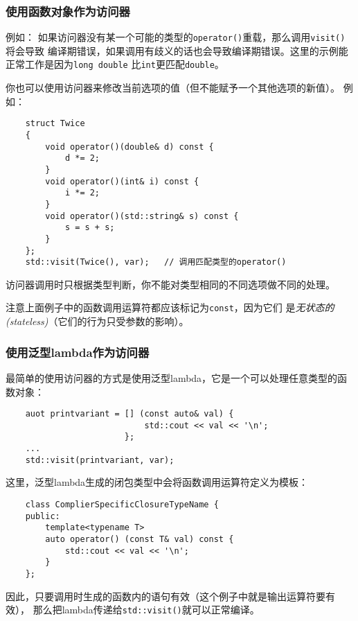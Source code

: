 \subsubsection{使用函数对象作为访问器}
例如：
如果访问器没有某一个可能的类型的\texttt{operator()}重载，那么调用\texttt{visit()}将会导致
编译期错误，如果调用有歧义的话也会导致编译期错误。这里的示例能正常工作是因为\texttt{long double}
比\texttt{int}更匹配\texttt{double}。

你也可以使用访问器来修改当前选项的值（但不能赋予一个其他选项的新值）。
例如：
\begin{lstlisting}
    struct Twice
    {
        void operator()(double& d) const {
            d *= 2;
        }
        void operator()(int& i) const {
            i *= 2;
        }
        void operator()(std::string& s) const {
            s = s + s;
        }
    };
    std::visit(Twice(), var);   // 调用匹配类型的operator()
\end{lstlisting}
访问器调用时只根据类型判断，你不能对类型相同的不同选项做不同的处理。

注意上面例子中的函数调用运算符都应该标记为\texttt{const}，因为它们
是\emph{无状态的(stateless)}（它们的行为只受参数的影响）。

\subsubsection{使用泛型lambda作为访问器}\label{ch16.3.3.2}
最简单的使用访问器的方式是使用泛型lambda，它是一个可以处理任意类型的函数对象：
\begin{lstlisting}
    auot printvariant = [] (const auto& val) {
                            std::cout << val << '\n';
                        };
    ...
    std::visit(printvariant, var);
\end{lstlisting}
这里，泛型lambda生成的闭包类型中会将函数调用运算符定义为模板：
\begin{lstlisting}
    class ComplierSpecificClosureTypeName {
    public:
        template<typename T>
        auto operator() (const T& val) const {
            std::cout << val << '\n';
        }
    };
\end{lstlisting}
因此，只要调用时生成的函数内的语句有效（这个例子中就是输出运算符要有效），
那么把lambda传递给\texttt{std::visit()}就可以正常编译。

